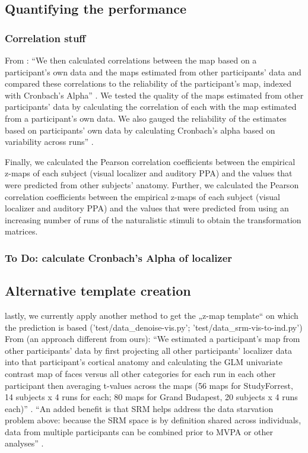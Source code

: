 \subsection{Quantifying the performance}


\subsubsection{Correlation stuff}
%
From \citep{jiahui2020predicting}: ``We then calculated correlations between the
map based on a participant’s own data and the maps estimated from other
participants' data and compared these correlations to the reliability of the
participant's map, indexed with Cronbach's Alpha'' \citep{jiahui2020predicting}.
%
We tested the quality of the maps estimated from other participants' data by
calculating the correlation of each with the map estimated from a participant's
own data. We also gauged the reliability of the estimates based on participants'
own data by calculating Cronbach's alpha based on variability across runs''
\citep{jiahui2020predicting}.

Finally, we calculated the Pearson correlation coefficients between the
empirical z-maps of each subject (visual localizer and auditory PPA) and the
values that were predicted from other subjects' anatomy.
%
Further, we calculated the Pearson correlation coefficients between the
empirical z-maps of each subject (visual localizer and auditory PPA) and the
values that were predicted from using an increasing number of runs of the
naturalistic stimuli to obtain the transformation matrices.

\subsubsection{To Do: calculate Cronbach's Alpha of localizer}


\subsection{Alternative template creation}
%
lastly, we currently apply another method to get the „z-map template“ on which
the prediction is based ('test/data\_denoise-vis.py';
'test/data\_srm-vis-to-ind.py')
%
From \citep{jiahui2020predicting} (an approach different from ours): ``We
estimated a participant's map from other participants' data by first projecting
all other participants' localizer data into that participant's cortical anatomy
and calculating the GLM univariate contrast map of faces versus all other
categories for each run in each other participant then averaging t-values across
the maps (56 maps for StudyForrest, 14 subjects x 4 runs for each; 80 maps for
Grand Budapest, 20 subjects x 4 runs each)'' \citep{jiahui2020predicting}.
%
``An added benefit is that SRM helps address the data starvation problem above:
because the SRM space is by definition shared across individuals, data from
multiple participants can be combined prior to MVPA or other analyses''
\citep{cohen2017computational}.




